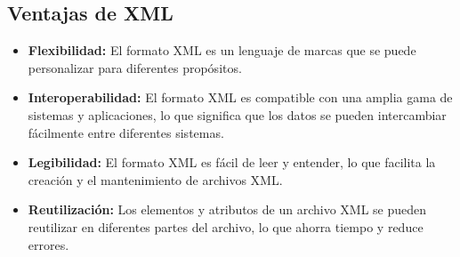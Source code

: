 \subsection*{Ventajas de XML}

\begin{itemize}
	\item \textbf{Flexibilidad:} El formato XML es un lenguaje de marcas que se puede personalizar para diferentes prop\'{o}sitos.
	\item \textbf{Interoperabilidad:} El formato XML es compatible con una amplia gama de sistemas y aplicaciones, lo que significa que los datos se pueden intercambiar f\'{a}cilmente entre diferentes sistemas.
	\item \textbf{Legibilidad:} El formato XML es f\'{a}cil de leer y entender, lo que facilita la creaci\'{o}n y el mantenimiento de archivos XML.
	\item \textbf{Reutilizaci\'{o}n:} Los elementos y atributos de un archivo XML se pueden reutilizar en diferentes partes del archivo, lo que ahorra tiempo y reduce errores.
\end{itemize}